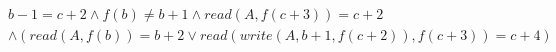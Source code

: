 \begin{align*}
%
& %
b - 1 = c + 2
%
\land
%
f(b)  \neq  b + 1
%
\land
%
\mathit{read}(A,f(c + 3)) = c + 2
~\\~
& %
%
\land
%
(\mathit{read}(A,f(b)) = b + 2 \lor \mathit{read}(\mathit{write}(A,b + 1,f(c + 2)),f(c + 3)) = c + 4)
%
\end{align*}
